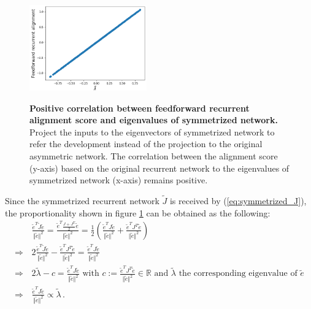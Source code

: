 \documentclass[11pt]{article}
\begin{document}
		\begin{figure} 
			\centering
			\caption{\textbf{Positive correlation between feedforward recurrent alignment score and eigenvalues of symmetrized network.} Project the inputs to the eigenvectors of symmetrized network to refer the development instead of the projection to the original asymmetric network. The correlation between the alignment score (y-axis) based on the original recurrent network to the eigenvalues of symmetrized network (x-axis) remains positive.}
			\includegraphics[width=0.45\textwidth]{../figures/ffrec_eigval_symmetrized_J.png}
			\label{fig:ffrec_symmetrized}
		\end{figure}
	Since the symmetrized recurrent network $\tilde{J}$ is received by (\ref{eq:symmetrized_J}), the proportionality shown in figure \ref{fig:ffrec_symmetrized} can be obtained as the following:
		\begin{equation}
			\begin{split}
				&\frac{\tilde{e}^T \tilde{J} \tilde{e}}{\Vert \tilde{e} \Vert^2} = \frac{\tilde{e}^T \frac{J + J^T}{2} \tilde{e}}{\Vert \tilde{e} \Vert^2} = \frac{1}{2} \left( \frac{\tilde{e}^T J \tilde{e}}{\Vert \tilde{e} \Vert^2} + \frac{\tilde{e}^T J^T \tilde{e}}{\Vert \tilde{e} \Vert^2} \right) \\
				\Rightarrow \,  & 2 \frac{\tilde{e}^T \tilde{J} \tilde{e}}{\Vert \tilde{e} \Vert^2} - \frac{\tilde{e}^T J^T \tilde{e}}{\Vert \tilde{e} \Vert^2} = \frac{\tilde{e}^T J \tilde{e}}{\Vert \tilde{e} \Vert^2} \\
				\Rightarrow \, & 2 \tilde{\lambda} - c = \frac{\tilde{e}^T J \tilde{e}}{\Vert \tilde{e} \Vert^2} \text{ with } c := \frac{\tilde{e}^T J^T \tilde{e}}{\Vert \tilde{e} \Vert^2} \in \mathbb{R} \text{ and $\tilde{\lambda}$ the corresponding eigenvalue of $\tilde{e}$} \\
				\Rightarrow \, & \frac{\tilde{e}^T J \tilde{e}}{\Vert \tilde{e} \Vert^2} \propto \tilde{\lambda} \, .
			\end{split}
		\end{equation}
	
\end{document}
